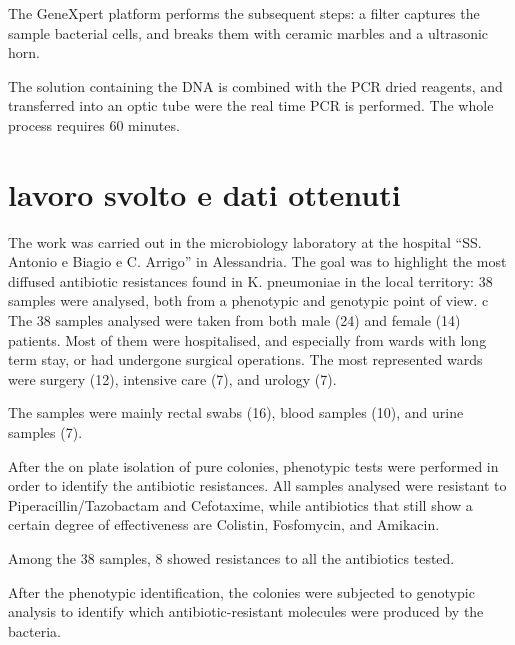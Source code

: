 \documentclass[11pt]{report}
\begin{document}
The GeneXpert platform performs the subsequent steps: a filter captures the sample bacterial cells, and breaks them with ceramic marbles and a ultrasonic horn.

The solution containing the DNA is combined with the PCR dried reagents, and transferred into an optic tube were the real time PCR is performed.
The whole process requires 60 minutes.


\chapter{lavoro svolto e dati ottenuti}



The work was carried out in the microbiology laboratory at the hospital ``SS. Antonio e Biagio e C. Arrigo'' in Alessandria.
The goal was to highlight the most diffused antibiotic resistances found in K. pneumoniae in the local territory: 38 samples were analysed, both from a phenotypic and genotypic point of view.
c
The 38 samples analysed were taken from both male (24) and female (14) patients.
Most of them were hospitalised, and especially from wards with long term stay, or had undergone surgical operations. 
The most represented wards were surgery (12), intensive care (7), and urology (7).


The samples were mainly rectal swabs (16), blood samples (10), and urine samples (7).


After the on plate isolation of pure colonies, phenotypic tests were performed in order to identify the antibiotic resistances. 
All samples analysed were resistant to Piperacillin/Tazobactam and Cefotaxime, while antibiotics that still show a certain degree of effectiveness are Colistin, Fosfomycin, and Amikacin.

Among the 38 samples, 8 showed resistances to all the antibiotics tested.


After the phenotypic identification, the colonies were subjected to genotypic analysis to identify which antibiotic-resistant molecules were produced by the bacteria. 
\end{document}
